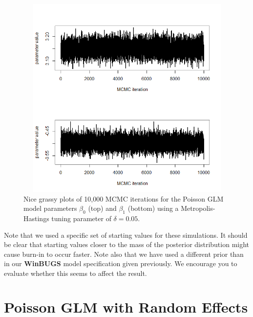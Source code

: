 \begin{figure}[ht]
\begin{center}
\includegraphics[height=4in,width=5in]{Ch3-Bayes/figs/poissonmcmc3}
\end{center}
\caption{Nice grassy plots of 10,000 MCMC iterations for the Poisson
  GLM model parameters $\beta_0$ (top) and $\beta_1$ (bottom) using a
  Metropolis-Hastings tuning parameter of $\delta = 0.05$.}
\label{glms.fig.grassy}
\end{figure}

Note that we used a specific set of starting values for these
simulations. It should be clear that starting values closer to the
mass of the posterior distribution might cause burn-in to occur
faster. 
Note also that we have
used a different prior than in our {\bf WinBUGS} model specification
given previously. We encourage you to evaluate 
 whether this seems to affect the result.

\section{Poisson GLM with Random Effects}

